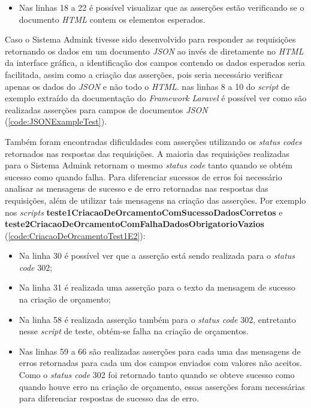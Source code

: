     \begin{itemize}
        \item Nas linhas 18 a 22 é possível visualizar que as asserções estão verificando se o documento \emph{HTML} contem os elementos esperados.
    \end{itemize}
    
    
    
    Caso o Sistema Admink tivesse sido desenvolvido para responder as requisições retornando os dados em um documento \emph{JSON} ao invés de diretamente no \emph{HTML} da interface gráfica, a identificação dos campos contendo os dados esperados seria facilitada, assim como a criação das asserções, pois seria necessário verificar apenas os dados do \emph{JSON} e não todo o \emph{HTML}. nas linhas 8 a 10 do \emph{script} de exemplo extraído da documentação do \emph{Framework Laravel} é possível ver como são realizadas asserções para campos de documentos \emph{JSON} (\autoref{code:JSONExampleTest}).
   
    
    
    Também foram encontradas dificuldades com asserções utilizando os \emph {status codes} retornados nas respostas das requisições. A maioria das requisições realizadas para o Sistema Admink retornam o mesmo \emph{status code} tanto quando se obtém sucesso como quando falha. Para diferenciar sucessos de erros foi necessário analisar as mensagens de sucesso e de erro retornadas nas respostas das requisições, além de utilizar tais mensagens na criação das asserções. Por exemplo nos \emph{scripts} \textbf{teste1CriacaoDeOrcamentoComSucessoDadosCorretos} e \textbf{teste2CriacaoDeOrcamentoComFalhaDadosObrigatorioVazios} (\autoref{code:CriacaoDeOrcamentoTest1E2}):
    
            \begin{itemize}
        \item Na linha 30 é possível ver que a asserção está sendo realizada para o \emph{status code} 302;
        \item Na linha 31 é realizada uma asserção para o texto da mensagem de sucesso na criação de orçamento;
        \item Na linha 58 é realizada asserção também para o \emph{status code} 302, entretanto nesse \emph{script} de teste, obtém-se falha na criação de orçamentos.
        \item Nas linhas 59 a 66 são realizadas asserções para cada uma das mensagens de erros retornadas para cada um dos campos enviados com valores não aceitos. Como o \emph{status code} 302 foi retornado tanto quando se obteve sucesso como quando houve erro na criação de orçamento, essas asserções foram necessárias para diferenciar respostas de sucesso das de erro.
    \end{itemize}
    
